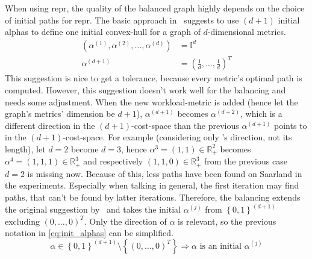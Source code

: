         When using \gls{repr}, the quality of the balanced graph highly depends on the choice of initial paths for \gls{repr}.
        The basic approach in~\cite{barth:alternative_multicriteria_routes} suggests to use $(d+1)$ initial alphas to define one initial convex-hull for a graph of $d$-dimensional \glspl{metric}.
        \begin{equation}
        \label{eq:init_alphas}
        \begin{aligned}
            \left( \alpha^{(1)}, \alpha^{(2)}, \dots, \alpha^{(d)} \right) &= \mathbb{I}^d\\
            \alpha^{(d+1)} &= \left( \frac{1}{d}, \dots, \frac{1}{d} \right)^T
        \end{aligned}
        \end{equation}
        This suggestion is nice to get a tolerance, because every \gls{metric}'s optimal path is computed.
        However, this suggestion doesn't work well for the \gls{balancing} and needs some adjustment.
        When the new workload-\gls{metric} is added (hence let the graph's \glspl{metric}' dimension be $d+1$), $\alpha^{(d+1)}$ becomes $\alpha^{(d+2)}$, which is a different direction in the $(d+1)$-cost-space than the previous $\alpha^{(d+1)}$ points to in the $(d+1)$-cost-space.
        For example (considering only \alpha's direction, not its length), let $d=2$ become $d=3$, hence $\alpha^3=(1, 1) \in \mathbb{R}_+^2$ becomes $\alpha^4=(1, 1, 1) \in \mathbb{R}_+^3$ and respectively $(1, 1, 0) \in \mathbb{R}_+^3$ from the previous case $d=2$ is missing now.
        Because of this, less paths have been found on Saarland in the experiments.
        Especially when talking in general, the first iteration may find paths, that can't be found by latter iterations.
        Therefore, the \gls{balancing} extends the original suggestion by~\cite{barth:alternative_multicriteria_routes} and takes the initial $\alpha^{(j)}$ from $\left\{ 0, 1 \right\}^{(d+1)}$ excluding $(0, \dots, 0)^T$.
        Only the direction of $\alpha$ is relevant, so the previous notation in \cref{eq:init_alphas} can be simplified.
        \begin{equation}
            \label{eq:new_init_alphas}
            \alpha \in \left\{ 0, 1 \right\}^{(d+1)} \setminus \left\{ \left( 0, \dots, 0 \right)^T \right\} \Rightarrow \alpha \text{ is an initial } \alpha^{(j)}
        \end{equation}


